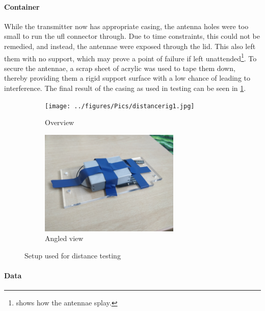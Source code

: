 \paragraph{Container}
While the transmitter now has appropriate casing, the antenna holes were too small
to run the \gls{ufl} connector through. Due to time constraints, this could not be
remedied, and instead, the antennae were exposed through the lid.
This also left them with no support, which may prove a point of failure if left unattended\footnote{
     shows how the antennae splay.
}. To secure the antennae, a scrap sheet of acrylic was used to tape them down, thereby
providing them a rigid support surface with a low chance of leading to interference.
The final result of the casing as used in testing can be seen in \cref{fig:distancerig}.

\begin{figure}[htbp]
    \centering
    \begin{subfigure}[b]{0.475\textwidth}
        \centering
        \texttt{[image: ../figures/Pics/distancerig1.jpg]}
        \caption{Overview}
    \end{subfigure}
    \hfill
    \begin{subfigure}[b]{0.475\textwidth}
        \centering
        \includegraphics[height=5cm,width=\textwidth,keepaspectratio]{../figures/Pics/distancerig2.jpg}
        \caption{Angled view}
    \end{subfigure}
    \caption{Setup used for distance testing}
    \label{fig:distancerig}
\end{figure}

\paragraph{Data}


